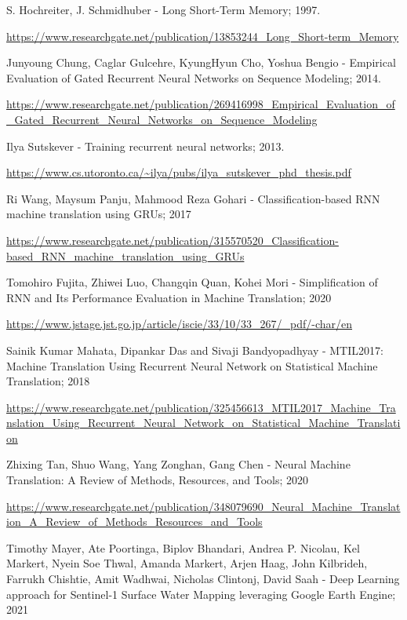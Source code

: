 \documentclass[a4paper,12pt]{article}
\begin{document}
	\begin{thebibliography}{}
	    \footnotesize {
		  S. Hochreiter, J. Schmidhuber	-	Long Short-Term Memory; 1997.
		
		\url{https://www.researchgate.net/publication/13853244_Long_Short-term_Memory}
		
		  Junyoung Chung, Caglar Gulcehre, KyungHyun Cho, Yoshua Bengio	-	Empirical Evaluation of Gated Recurrent Neural Networks on Sequence Modeling; 2014.
		
		\url{https://www.researchgate.net/publication/269416998_Empirical_Evaluation_of_Gated_Recurrent_Neural_Networks_on_Sequence_Modeling}
		
		 Ilya Sutskever	-	Training recurrent neural networks; 2013.
		
		\url{https://www.cs.utoronto.ca/~ilya/pubs/ilya_sutskever_phd_thesis.pdf}
		
		 Ri Wang, Maysum Panju, Mahmood Reza Gohari -   Classification-based RNN machine translation using GRUs; 2017
		
		\url{https://www.researchgate.net/publication/315570520_Classification-based_RNN_machine_translation_using_GRUs}
		
		 Tomohiro Fujita, Zhiwei Luo, Changqin Quan, Kohei Mori - Simplification of RNN and Its Performance Evaluation in Machine Translation; 2020
		
		\url{https://www.jstage.jst.go.jp/article/iscie/33/10/33_267/_pdf/-char/en}
		
		 Sainik Kumar Mahata, Dipankar Das and Sivaji Bandyopadhyay -  MTIL2017: Machine Translation Using Recurrent Neural Network on Statistical Machine Translation; 2018
		
		\url{https://www.researchgate.net/publication/325456613_MTIL2017_Machine_Translation_Using_Recurrent_Neural_Network_on_Statistical_Machine_Translation}
		
		 Zhixing Tan, Shuo Wang, Yang Zonghan, Gang Chen - Neural Machine Translation: A Review of Methods, Resources, and Tools; 2020
		
		\url{https://www.researchgate.net/publication/348079690_Neural_Machine_Translation_A_Review_of_Methods_Resources_and_Tools}
		
		 Timothy Mayer, Ate Poortinga, Biplov Bhandari, Andrea P. Nicolau, Kel Markert, Nyein Soe Thwal, Amanda Markert, Arjen Haag, John Kilbrideh, Farrukh Chishtie, Amit Wadhwai, Nicholas Clintonj, David Saah - Deep Learning approach for Sentinel-1 Surface Water Mapping leveraging Google Earth Engine; 2021
		
}
\end{thebibliography}
\end{document}

